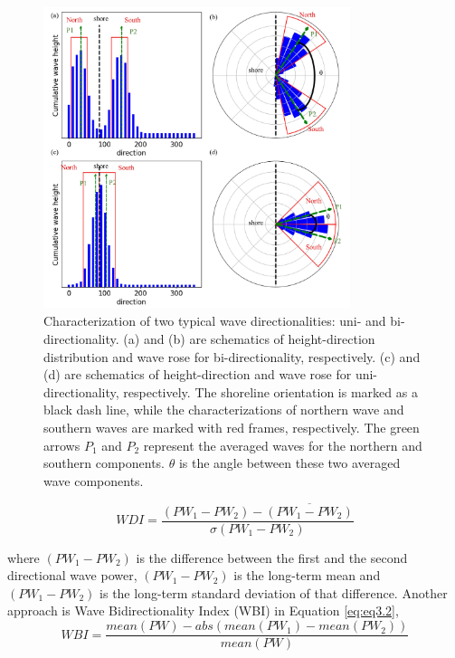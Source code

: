 \begin{figure}[htbp]
  \centering
  \includegraphics[width=0.8\textwidth]{chapter3/resources/figure3-2.jpg}
  \caption{Characterization of two typical wave directionalities: uni- and bi-directionality. (a) and (b) are schematics of height-direction distribution and wave rose for bi-directionality, respectively. (c) and (d) are schematics of height-direction and wave rose for uni-directionality, respectively. The shoreline orientation is marked as a black dash line, while the characterizations of northern wave and southern waves are marked with red frames, respectively. The green arrows $P_1$ and $P_2$ represent the averaged waves for the northern and southern components. $\theta$ is the angle between these two averaged wave components.}
  \label{fig:fig3.2}
\end{figure}

\begin{equation}
    WDI = \frac{(PW_1-PW_2) - \overline{(PW_1-PW_2)}}{\sigma(PW_1-PW_2)}
\label{eq:eq3.1}
\end{equation}

where $(PW_1-PW_2)$ is the difference between the first and the second directional wave power, $(PW_1-PW_2)$ is the long-term mean and $(PW_1-PW_2)$ is the long-term standard deviation of that difference. Another approach is Wave Bidirectionality Index (WBI) \citep{abdelhady_shoreline_2025} in Equation \ref{eq:eq3.2},
\begin{equation}
    WBI = \frac{mean(PW) - abs(mean(PW_1)-mean(PW_2))}{mean(PW)}
\label{eq:eq3.2}
\end{equation}

